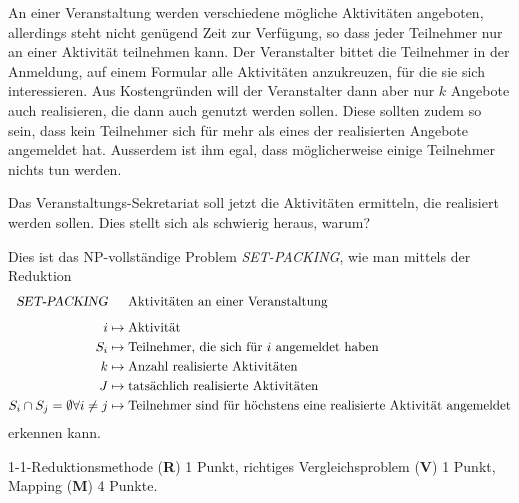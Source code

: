 An einer Veranstaltung werden verschiedene mögliche Aktivitäten angeboten,
allerdings steht nicht genügend Zeit zur Verfügung, so dass jeder
Teilnehmer nur an einer Aktivität teilnehmen kann.
Der Veranstalter bittet die Teilnehmer in der Anmeldung, auf einem
Formular alle Aktivitäten anzukreuzen, für die sie sich interessieren.
Aus Kostengründen will der Veranstalter dann aber nur $k$ Angebote
auch realisieren, die dann auch genutzt werden sollen.
Diese sollten zudem so sein, dass kein Teilnehmer sich für mehr als
eines der realisierten Angebote angemeldet hat.
Ausserdem ist ihm egal, dass möglicherweise einige Teilnehmer nichts tun
werden.

Das Veranstaltungs-Sekretariat soll jetzt die Aktivitäten ermitteln, 
die realisiert werden sollen.
Dies stellt sich als schwierig heraus, warum?


\begin{loesung}
Dies ist das NP-vollständige Problem \textsl{SET-PACKING}, wie man 
mittels der Reduktion
\begin{align*}
\textsl{SET-PACKING}&\phantom{\mathstrut\mapsto\mathstrut}\textrm{Aktivitäten an einer Veranstaltung}
\\[5pt]
i&\mapsto \textrm{Aktivität}
\\
S_i&\mapsto \textrm{Teilnehmer, die sich für $i$ angemeldet haben}
\\
k&\mapsto \textrm{Anzahl realisierte Aktivitäten}
\\
J&\mapsto \textrm{tatsächlich realisierte Aktivitäten}
\\
S_i\cap S_j=\emptyset\forall i\ne j
&\mapsto \textrm{Teilnehmer sind für höchstens eine realisierte Aktivität angemeldet}
\end{align*}
erkennen kann.
\end{loesung}

\begin{bewertung}
1-1-Reduktionsmethode ({\bf R}) 1 Punkt,
richtiges Vergleichsproblem ({\bf V}) 1 Punkt,
Mapping ({\bf M}) 4 Punkte.
\end{bewertung}

